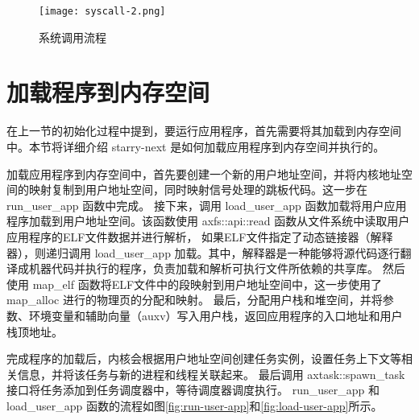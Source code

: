 \begin{figure}[H]
    \centering
    \texttt{[image: syscall-2.png]}
    \caption{系统调用流程}
    \label{fig:syscall}
\end{figure}

\section{加载程序到内存空间}

在上一节的初始化过程中提到，要运行应用程序，首先需要将其加载到内存空间中。本节将详细介绍 starry-next 是如何加载应用程序到内存空间并执行的。

加载应用程序到内存空间中，首先要创建一个新的用户地址空间，并将内核地址空间的映射复制到用户地址空间，同时映射信号处理的跳板代码。这一步在 run\_user\_app 函数中完成。
接下来，调用 load\_user\_app 函数加载将用户应用程序加载到用户地址空间。该函数使用 axfs::api::read 函数从文件系统中读取用户应用程序的ELF文件数据并进行解析，
如果ELF文件指定了动态链接器（解释器），则递归调用 load\_user\_app 加载。其中，解释器是一种能够将源代码逐行翻译成机器代码并执行的程序，负责加载和解析可执行文件所依赖的共享库。
然后使用 map\_elf 函数将ELF文件中的段映射到用户地址空间中，这一步使用了 map\_alloc 进行的物理页的分配和映射。
最后，分配用户栈和堆空间，并将参数、环境变量和辅助向量（auxv）写入用户栈，返回应用程序的入口地址和用户栈顶地址。

完成程序的加载后，内核会根据用户地址空间创建任务实例，设置任务上下文等相关信息，并将该任务与新的进程和线程关联起来。
最后调用 axtask::spawn\_task 接口将任务添加到任务调度器中，等待调度器调度执行。
run\_user\_app 和 load\_user\_app 函数的流程如图\ref{fig:run-user-app}和\ref{fig:load-user-app}所示。



